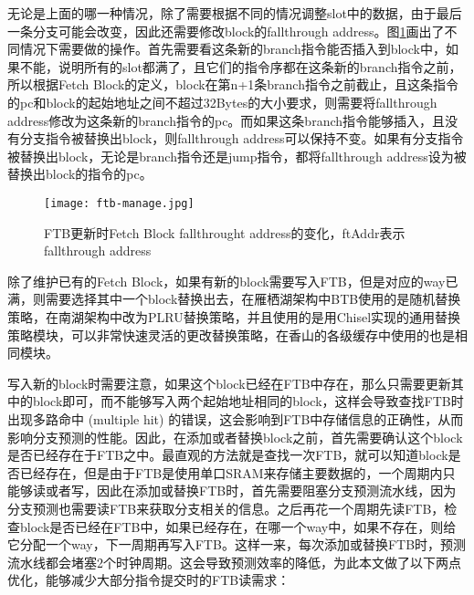 
无论是上面的哪一种情况，除了需要根据不同的情况调整slot中的数据，由于最后一条分支可能会改变，因此还需要修改block的fallthrough address。图\ref{fig:figure32}画出了不同情况下需要做的操作。首先需要看这条新的branch指令能否插入到block中，如果不能，说明所有的slot都满了，且它们的指令序都在这条新的branch指令之前，所以根据Fetch Block的定义，block在第n+1条branch指令之前截止，且这条指令的pc和block的起始地址之间不超过32Bytes的大小要求，则需要将fallthrough address修改为这条新的branch指令的pc。而如果这条branch指令能够插入，且没有分支指令被替换出block，则fallthrough address可以保持不变。如果有分支指令被替换出block，无论是branch指令还是jump指令，都将fallthrough address设为被替换出block的指令的pc。

\begin{figure}[htb]
	\centering
	\setlength\tabcolsep{3pt}  %
	\vspace{5pt} %
	\texttt{[image: ftb-manage.jpg]}
	\caption{FTB更新时Fetch Block fallthrought address的变化，ftAddr表示fallthrough address}
	\label{fig:figure32}
\end{figure}

除了维护已有的Fetch Block，如果有新的block需要写入FTB，但是对应的way已满，则需要选择其中一个block替换出去，在雁栖湖架构中BTB使用的是随机替换策略，在南湖架构中改为PLRU替换策略，并且使用的是用Chisel实现的通用替换策略模块，可以非常快速灵活的更改替换策略，在香山的各级缓存中使用的也是相同模块。

写入新的block时需要注意，如果这个block已经在FTB中存在，那么只需要更新其中的block即可，而不能够写入两个起始地址相同的block，这样会导致查找FTB时出现多路命中 (multiple hit) 的错误，这会影响到FTB中存储信息的正确性，从而影响分支预测的性能。因此，在添加或者替换block之前，首先需要确认这个block是否已经存在于FTB之中。最直观的方法就是查找一次FTB，就可以知道block是否已经存在，但是由于FTB是使用单口SRAM来存储主要数据的，一个周期内只能够读或者写，因此在添加或替换FTB时，首先需要阻塞分支预测流水线，因为分支预测也需要读FTB来获取分支相关的信息。之后再花一个周期先读FTB，检查block是否已经在FTB中，如果已经存在，在哪一个way中，如果不存在，则给它分配一个way，下一周期再写入FTB。这样一来，每次添加或替换FTB时，预测流水线都会堵塞2个时钟周期。这会导致预测效率的降低，为此本文做了以下两点优化，能够减少大部分指令提交时的FTB读需求：

